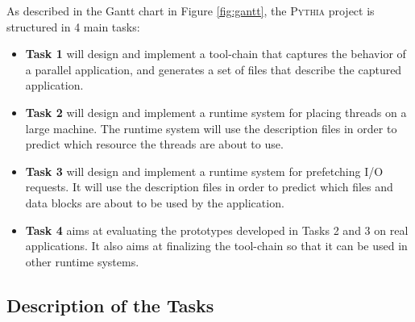 \documentclass[a4paper,11pt,defblank]{article}
\newcommand{\pname}{\textsc{Pythia}\xspace}
\begin{document}
As described in the Gantt chart in Figure \ref{fig:gantt}, the \pname
project is structured in 4 main tasks:
\begin{itemize}
  \item \textbf{Task 1} will design and implement a tool-chain that
    captures the behavior of a parallel application, and generates a
    set of files that describe the captured application.
  \item \textbf{Task 2} will design and implement a runtime system for
    placing threads on a large machine. The runtime system will use
    the description files in order to predict which resource the
    threads are about to use.
  \item \textbf{Task 3} will design and implement a runtime system for
    prefetching I/O requests. It will use the description files in
    order to predict which files and data blocks are about to be used
    by the application.
  \item \textbf{Task 4} aims at evaluating the prototypes developed in
    Tasks 2 and 3 on real applications. It also aims at finalizing the
    tool-chain so that it can be used in other runtime systems.
\end{itemize}

\subsection{Description of the Tasks}
%
%
%

%
%
\end{document}
